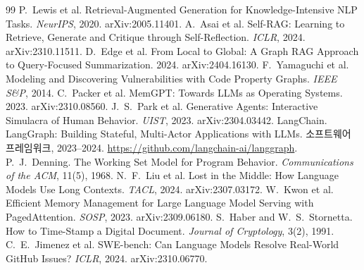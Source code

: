 \documentclass[11pt]{article}
\begin{document}
\begin{thebibliography}{99}
 P.~Lewis et al. Retrieval-Augmented Generation for
Knowledge-Intensive NLP Tasks. \emph{NeurIPS}, 2020. arXiv:2005.11401.
 A.~Asai et al. Self-RAG: Learning to Retrieve, Generate
and Critique through Self-Reflection. \emph{ICLR}, 2024. arXiv:2310.11511.
 D.~Edge et al. From Local to Global: A Graph RAG
Approach to Query-Focused Summarization. 2024. arXiv:2404.16130.
 F.~Yamaguchi et al. Modeling and Discovering
Vulnerabilities with Code Property Graphs. \emph{IEEE S\&P}, 2014.
 C.~Packer et al. MemGPT: Towards LLMs as Operating
Systems. 2023. arXiv:2310.08560.
 J.~S.~Park et al. Generative Agents: Interactive
Simulacra of Human Behavior. \emph{UIST}, 2023. arXiv:2304.03442.
 LangChain. LangGraph: Building Stateful, Multi-Actor
Applications with LLMs. 소프트웨어 프레임워크, 2023--2024.
\url{https://github.com/langchain-ai/langgraph}.
 P.~J.~Denning. The Working Set Model for Program
Behavior. \emph{Communications of the ACM}, 11(5), 1968.
 N.~F.~Liu et al. Lost in the Middle: How Language Models Use
Long Contexts. \emph{TACL}, 2024. arXiv:2307.03172.
 W.~Kwon et al. Efficient Memory Management for Large
Language Model Serving with PagedAttention. \emph{SOSP}, 2023. arXiv:2309.06180.
 S.~Haber and W.~S.~Stornetta. How to Time-Stamp a
Digital Document. \emph{Journal of Cryptology}, 3(2), 1991.
 C.~E.~Jimenez et al. SWE-bench: Can Language Models
Resolve Real-World GitHub Issues? \emph{ICLR}, 2024. arXiv:2310.06770.
\end{thebibliography}
\end{document}
